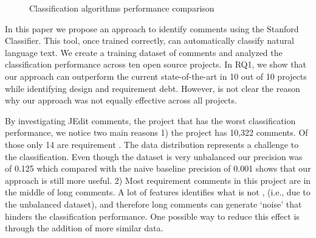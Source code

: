 \begin{figure}[!thb]
  \centering
  \caption{Classification algorithms performance comparison}
  \label{fig:algorithms_comparison}
\end{figure}

In this paper we propose an approach to identify \SATD comments using the Stanford Classifier. This tool, once trained correctly, can automatically classify natural language text. We create a training dataset of \SATD comments and analyzed the classification performance across ten open source projects. In RQ1, we show that our approach can outperform the current state-of-the-art in 10 out of 10 projects while identifying design and requirement debt. However, is not clear the reason why our approach was not equally effective across all projects.

By investigating JEdit comments, the project that has the worst classification performance, we notice two main reasons 1) the project has 10,322 comments. Of those only 14 are requirement \SATD. The data distribution represents a challenge to the classification. Even though the dataset is very unbalanced our precision was of 0.125 which compared with the naive baseline precision of 0.001 shows that our approach is still more useful. 2) Most requirement \SATD comments in this project are in the middle of long comments. A lot of features identifies what is not \SATD, (i.e., due to the unbalanced dataset), and therefore long comments can generate `noise' that hinders the classification performance. One possible way to reduce this effect is through the addition of more similar data. 

